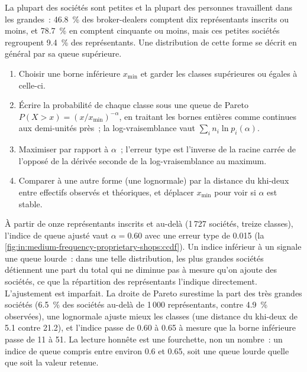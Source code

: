 La plupart des sociétés sont petites et la plupart des personnes travaillent dans les grandes~: 46.8~\% des broker-dealers comptent dix représentants inscrits
ou moins, et 78.7~\% en comptent cinquante ou moins, mais ces petites sociétés regroupent 9.4~\% des représentants.
Une distribution de cette forme se décrit en général par sa queue supérieure.

\begin{method}\label{met:in:medium-frequency-proprietary-shops:fit}
\begin{enumerate}
\item Choisir une borne inférieure $x_{\min}$ et garder les classes supérieures ou égales à celle-ci.
\item Écrire la probabilité de chaque classe sous une queue de Pareto $P(X>x)=(x/x_{\min})^{-\alpha}$, en traitant les bornes entières comme
continues aux demi-unités près~; la log-vraisemblance vaut $\sum_i n_i\ln p_i(\alpha)$.
\item Maximiser par rapport à $\alpha$~; l'erreur type est l'inverse de la racine carrée de l'opposé de la dérivée seconde de la
log-vraisemblance au maximum.
\item Comparer à une autre forme (une lognormale) par la distance du khi-deux entre effectifs observés et théoriques, et
déplacer $x_{\min}$ pour voir si $\alpha$ est stable.
\end{enumerate}
\end{method}

À partir de onze représentants inscrits et au-delà (1\,727 sociétés, treize classes), l'indice de queue ajusté vaut $\alpha=0.60$ avec une
erreur type de 0.015 (la \cref{fig:in:medium-frequency-proprietary-shops:ccdf}). Un indice inférieur à un signale une queue lourde~: dans
une telle distribution, les plus grandes sociétés détiennent une part du total qui ne diminue pas à mesure qu'on ajoute des sociétés, ce que
la répartition des représentants l'indique directement. L'ajustement est imparfait. La droite de Pareto surestime la part des
très grandes sociétés (6.5~\% des sociétés au-delà de 1\,000 représentants, contre 4.9~\% observées), une lognormale ajuste mieux les classes (une
distance du khi-deux de 5.1 contre 21.2), et l'indice passe de 0.60 à 0.65 à mesure que la borne inférieure passe de 11 à 51.
La lecture honnête est une fourchette, non un nombre~: un indice de queue compris entre environ 0.6 et 0.65, soit une queue lourde quelle que soit la valeur retenue.

